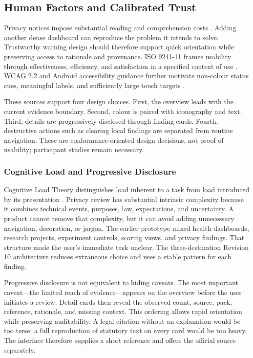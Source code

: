 \subsection{Human Factors and Calibrated Trust}

Privacy notices impose substantial reading and comprehension costs \cite{12,13}. Adding another dense dashboard can reproduce the problem it intends to solve. Trustworthy warning design should therefore support quick orientation while preserving access to rationale and provenance. ISO 9241-11 frames usability through effectiveness, efficiency, and satisfaction in a specified context of use \cite{iso924111}. WCAG 2.2 and Android accessibility guidance further motivate non-colour status cues, meaningful labels, and sufficiently large touch targets \cite{wcag22,androidaccess}.

These sources support four design choices. First, the overview leads with the current evidence boundary. Second, colour is paired with iconography and text. Third, details are progressively disclosed through finding cards. Fourth, destructive actions such as clearing local findings are separated from routine navigation. These are conformance-oriented design decisions, not proof of usability; participant studies remain necessary.

\subsubsection{Cognitive Load and Progressive Disclosure}

Cognitive Load Theory distinguishes load inherent to a task from load introduced by its presentation \cite{27}. Privacy review has substantial intrinsic complexity because it combines technical events, purposes, law, expectations, and uncertainty. A product cannot remove that complexity, but it can avoid adding unnecessary navigation, decoration, or jargon. The earlier prototype mixed health dashboards, research projects, experiment controls, scoring views, and privacy findings. That structure made the user's immediate task unclear. The three-destination Revision 10 architecture reduces extraneous choice and uses a stable pattern for each finding.

Progressive disclosure is not equivalent to hiding caveats. The most important caveat---the limited reach of evidence---appears on the overview before the user initiates a review. Detail cards then reveal the observed count, source, pack, reference, rationale, and missing context. This ordering allows rapid orientation while preserving auditability. A legal citation without an explanation would be too terse; a full reproduction of statutory text on every card would be too heavy. The interface therefore supplies a short reference and offers the official source separately.


